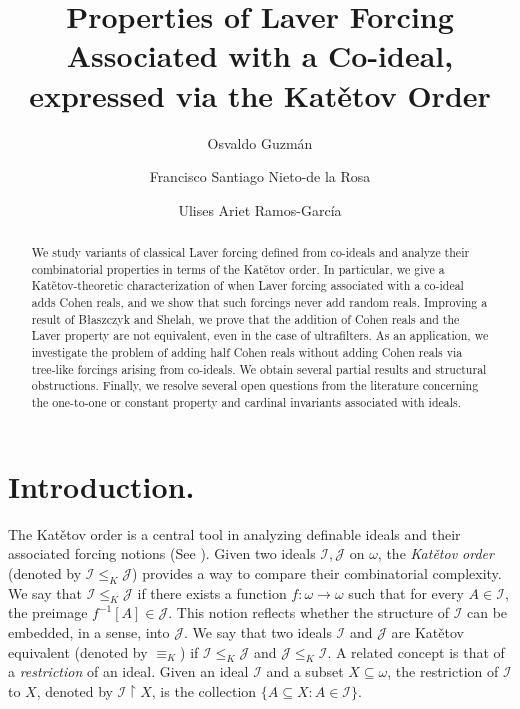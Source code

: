 \documentclass{amsart}
\title[Properties of Laver Forcing Associated with a Co-ideal]{Properties of Laver Forcing Associated with a Co-ideal, expressed via the Kat\v{e}tov Order}
\author[Guzmán]{Osvaldo Guzmán}
\author[Nieto-de la Rosa]{Francisco Santiago Nieto-de la Rosa}
\author[Ramos]{Ulises Ariet Ramos-García}
\theoremstyle{definition}
\theoremstyle{remark}
\numberwithin{equation}{section}
\newcommand{\id}{\mathcal{I}}
\begin{document}
\begin{abstract}
    We study variants of classical Laver forcing defined from co-ideals and analyze their combinatorial properties in terms of the Kat\v{e}tov order. In particular, we give a Kat\v{e}tov-theoretic characterization of when Laver forcing associated with a co-ideal adds Cohen reals, and we show that such forcings never add random reals. Improving a result of B{\l}aszczyk and Shelah, we prove that the addition of Cohen reals and the Laver property are not equivalent, even in the case of ultrafilters. As an application, we investigate the problem of adding half Cohen reals without adding Cohen reals via tree-like forcings arising from co-ideals. We obtain several partial results and structural obstructions. Finally, we resolve several open questions from the literature concerning the one-to-one or constant property and cardinal invariants associated with ideals.
\end{abstract}

\maketitle

\section{Introduction.}

The Kat\v{e}tov order is a central tool in analyzing definable ideals and their associated forcing notions (See \cite{katvetov}). Given two ideals \( \mathcal{I}, \mathcal{J} \) on \( \omega \), the \emph{Kat\v{e}tov order} (denoted by \( \mathcal{I} \leq_K \mathcal{J} \)) provides a way to compare their combinatorial complexity. We say that \( \mathcal{I} \leq_K \mathcal{J} \) if there exists a function \( f: \omega \to \omega \) such that for every \( A \in \mathcal{I} \), the preimage \( f^{-1}[A] \in \mathcal{J} \). This notion reflects whether the structure of \( \mathcal{I} \) can be embedded, in a sense, into \( \mathcal{J} \). We say that two ideals $\id$ and $\mathcal{J}$ are Kat\v{e}tov equivalent (denoted by $\equiv_K$) if $\id \leq_K \mathcal{J}$ and $\mathcal{J}\leq_K\id$. A related concept is that of a \emph{restriction} of an ideal. Given an ideal \( \mathcal{I} \) and a subset \( X \subseteq \omega \), the restriction of \( \mathcal{I} \) to \( X \), denoted by \( \mathcal{I} \restriction X \), is the collection \( \{ A \subseteq X : A \in \mathcal{I} \} \). %
\end{document}
